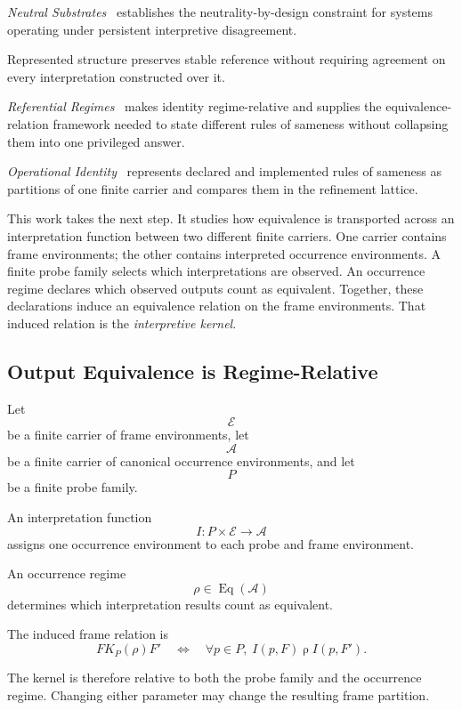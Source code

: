 \documentclass[11pt]{article}
\theoremstyle{plain}
\theoremstyle{definition}
\theoremstyle{remark}
\begin{document}
\emph{Neutral Substrates}~\citep{case2026neutral}
establishes the neutrality-by-design constraint
for systems operating under persistent interpretive disagreement.

Represented structure preserves stable reference
without requiring agreement
on every interpretation constructed over it.

\emph{Referential Regimes}~\citep{case2026referential}
makes identity regime-relative
and supplies the equivalence-relation framework
needed to state different rules of sameness
without collapsing them into one privileged answer.

\emph{Operational Identity}~\citep{case2026operational}
represents declared and implemented rules of sameness
as partitions of one finite carrier
and compares them
in the refinement lattice.

This work takes the next step.
It studies how equivalence is transported
across an interpretation function
between two different finite carriers.
One carrier contains frame environments;
the other contains interpreted occurrence environments.
A finite probe family selects which interpretations are observed.
An occurrence regime declares
which observed outputs count as equivalent.
Together, these declarations induce
an equivalence relation on the frame environments.
That induced relation is the \emph{interpretive kernel}.

\subsection{Output Equivalence is Regime-Relative}

Let
\[
  \mathcal{E}
\]
be a finite carrier
of frame environments,
let
\[
  \mathcal{A}
\]
be a finite carrier
of canonical occurrence environments,
and let
\[
  P
\]
be a finite probe family.

An interpretation function
\[
  I:
  P\times\mathcal{E}
  \longrightarrow
  \mathcal{A}
\]
assigns one occurrence environment
to each probe and frame environment.

An occurrence regime
\[
  \rho
  \in
  \operatorname{Eq}(\mathcal{A})
\]
determines which interpretation results
count as equivalent.

The induced frame relation is
\[
  F
  \mathrel{K_P(\rho)}
  F'
  \quad\Longleftrightarrow\quad
  \forall p\in P,\;
  I(p,F)
  \mathrel{\rho}
  I(p,F').
\]

The kernel is therefore relative
to both the probe family and the occurrence regime.
Changing either parameter may change the resulting frame partition.
\end{document}
